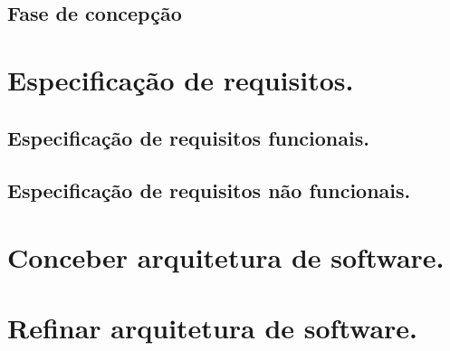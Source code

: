 \subsection{Fase de concepção}
\section{Especificação de requisitos.}
\subsection{Especificação de requisitos funcionais.}
\subsection{Especificação de requisitos não funcionais.}
\section{Conceber arquitetura de software.}
\section{Refinar arquitetura de software.}